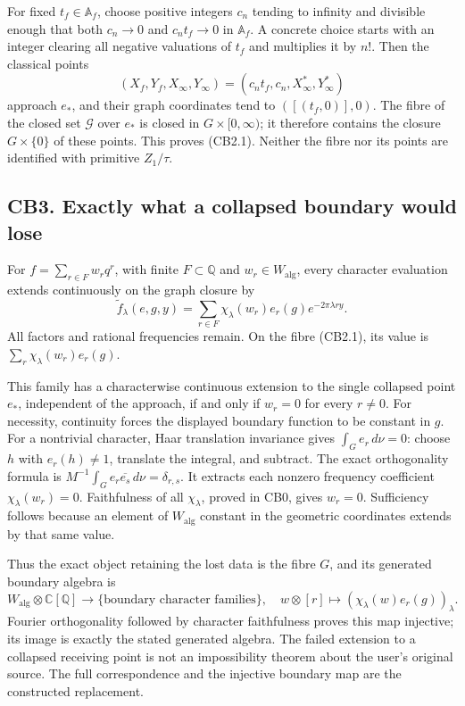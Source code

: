 For fixed \(t_f\in\mathbb A_f\), choose positive integers \(c_n\)
tending to infinity and divisible enough that both \(c_n\to0\) and
\(c_n t_f\to0\) in \(\mathbb A_f\). A concrete choice starts with an
integer clearing all negative valuations of \(t_f\) and multiplies it by
\(n!\). Then the classical points \[
(X_f,Y_f,X_\infty,Y_\infty)
=(c_n t_f,c_n,X_\infty^*,Y_\infty^*)
\] approach \(e_*\), and their graph coordinates tend to
\(([(t_f,0)],0)\). The fibre of the closed set \(\mathscr G\) over
\(e_*\) is closed in \(G\times[0,\infty)\); it therefore contains the
closure \(G\times\{0\}\) of these points. This proves (CB2.1). Neither
the fibre nor its points are identified with primitive \(Z_1/\tau\).

\subsection{CB3. Exactly what a collapsed boundary would
lose}\label{cb3.-exactly-what-a-collapsed-boundary-would-lose}

For \(f=\sum_{r\in F}w_rq^r\), with finite \(F\subset\mathbb Q\) and
\(w_r\in W_{\mathrm{alg}}\), every character evaluation extends
continuously on the graph closure by \[
\widetilde f_\lambda(e,g,y)
=\sum_{r\in F}\chi_\lambda(w_r)e_r(g)e^{-2\pi\lambda r y}.
\tag{CB3.1}
\] All factors and rational frequencies remain. On the fibre (CB2.1),
its value is \(\sum_r\chi_\lambda(w_r)e_r(g)\).

This family has a characterwise continuous extension to the single
collapsed point \(e_*\), independent of the approach, if and only if
\(w_r=0\) for every \(r\ne0\). For necessity, continuity forces the
displayed boundary function to be constant in \(g\). For a nontrivial
character, Haar translation invariance gives \(\int_G e_r\,d\nu=0\):
choose \(h\) with \(e_r(h)\ne1\), translate the integral, and subtract.
The exact orthogonality formula is
\(M^{-1}\int_Ge_r\overline{e_s}\,d\nu=\delta_{r,s}\). It extracts each
nonzero frequency coefficient \(\chi_\lambda(w_r)=0\). Faithfulness of
all \(\chi_\lambda\), proved in CB0, gives \(w_r=0\). Sufficiency
follows because an element of \(W_{\mathrm{alg}}\) constant in the
geometric coordinates extends by that same value.

Thus the exact object retaining the lost data is the fibre \(G\), and
its generated boundary algebra is \[
W_{\mathrm{alg}}\otimes\mathbb C[\mathbb Q]
\longrightarrow\{\text{boundary character families}\},\quad
w\otimes[r]\longmapsto(\chi_\lambda(w)e_r(g))_\lambda.
\tag{CB3.2}
\] Fourier orthogonality followed by character faithfulness proves this
map injective; its image is exactly the stated generated algebra. The
failed extension to a collapsed receiving point is not an impossibility
theorem about the user's original source. The full correspondence and
the injective boundary map are the constructed replacement.

